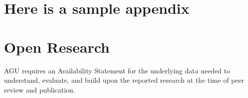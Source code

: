 \documentclass[draft]{agujournal2019}
\begin{document}


%
%
%
%
\appendix
\section{Here is a sample appendix}

%
%

%

%



\section{Open Research}
AGU requires an Availability Statement for the underlying data needed to understand, evaluate, and build upon the reported research at the time of peer review and publication.
\end{document}
